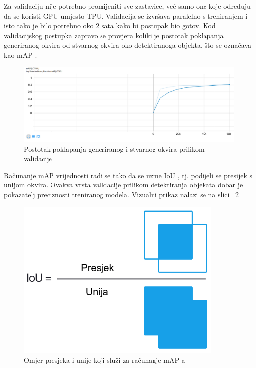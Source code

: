Za validaciju nije potrebno promijeniti sve zastavice, već samo one koje određuju da se koristi GPU umjesto TPU. Validacija se izvršava paralelno s treniranjem i isto tako je bilo potrebno oko 
2 sata kako bi postupak bio gotov. Kod validacijskog postupka zapravo se provjera koliki je postotak poklapanja generiranog okvira od stvarnog okvira oko detektiranoga objekta, što se označava kao
mAP . 

\begin{figure}[htb]
    \centering
    \includegraphics[width=14cm]{img/eval-mAP.png}
    \caption{Postotak poklapanja generiranog i stvarnog okvira prilikom validacije}
    \label{Eval-mAP}
\end{figure}

Računanje mAP vrijednosti radi se tako da se uzme IoU , tj. podijeli se presijek s unijom okvira. Ovakva vrsta validacije prilikom detektiranja objekata
dobar je pokazatelj preciznosti treniranog modela. Vizualni prikaz nalazi se na slici ~\ref{IoU}

\begin{figure}[htb]
    \centering
    \includegraphics[width=10cm]{img/iou_equation.png}
    \caption{Omjer presjeka i unije koji služi za računanje mAP-a}
    \label{IoU}
\end{figure}

